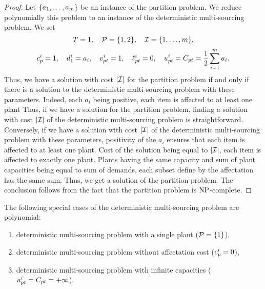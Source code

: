 \begin{proof}
Let $\crbracket{a_1,\ldots,a_m}$ be an instance of the partition problem.
We reduce polynomially this problem to an instance of the deterministic multi-sourcing problem.
We set
$$
  \horizon=1
  ,\quad
  \plants=\crbracket{1,2}
  ,\quad
  \REF=\range[1]{m},
$$
$$
  c_p^i=1
  ,\quad
  d_1^i=a_i
  ,\quad
  v_{pt}^i=1
  ,\quad
  \ell_{pt}^i=0
  ,\quad
  u_{pt}^i=C_{pt}=\frac{1}{2}\sum_{i=1}^{m}a_i.
$$
Thus, we have a solution with cost $\card{\REF}$ for the partition problem if and only if there is a solution to the deterministic multi-sourcing problem with these parameters.
Indeed, each $a_i$ being positive, each item is affected to at least one plant
Thus, if we have a solution for the partition problem, finding a solution with cost $\card{\REF}$ of the deterministic multi-sourcing problem is straightforward.
Conversely, if we have a solution with cost $\card{\REF}$ of the deterministic multi-sourcing problem with these parameters, positivity of the $a_i$ ensures that each item is affected to at least one plant.
Cost of the solution being equal to $\card{\REF}$, each item is affected to exactly one plant.
Plants having the same capacity and sum of plant capacities being equal to sum of demands, each subset define by the affectation has the same sum.
Thus, we get a solution of the partition problem.
The conclusion follows from the fact that the partition problem is $\operatorname{NP}$-complete.
\end{proof}


\begin{prop}\label{prop:deterministic-multi-sourcing:polynomial-cases}
The following special cases of the deterministic multi-sourcing problem are polynomial:
\begin{enumerate}
  \item deterministic multi-sourcing problem with a single plant ($\plants=\crbracket{1}$),
  \item deterministic multi-sourcing problem without affectation cost ($c_p^i=0$),
  \item deterministic multi-sourcing problem with infinite capacities ($u_{pt}^i=C_{pt}=+\infty$).
\end{enumerate}
\end{prop}


